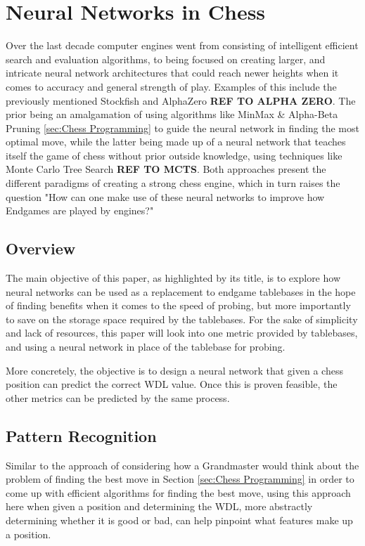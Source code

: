 \section{Neural Networks in Chess}
\label{sec:NeuralNets}

Over the last decade computer engines went from consisting of intelligent efficient search and evaluation algorithms, to being focused on creating larger, and intricate neural network architectures that could reach newer heights when it comes to accuracy and general strength of play. Examples of this include the previously mentioned Stockfish \cite{stockfish2024} and AlphaZero \textbf{REF TO ALPHA ZERO}. The prior being an amalgamation of using algorithms like MinMax \& Alpha-Beta Pruning \ref{sec:Chess Programming} to guide the neural network in finding the most optimal move, while the latter being made up of a neural network that teaches itself the game of chess without prior outside knowledge, using techniques like Monte Carlo Tree Search \textbf{REF TO MCTS}. Both approaches present the different paradigms of creating a strong chess engine, which in turn raises the question "How can one make use of these neural networks to improve how Endgames are played by engines?"

\subsection{Overview}
The main objective of this paper, as highlighted by its title, is to explore how neural networks can be used as a replacement to endgame tablebases in the hope of finding benefits when it comes to the speed of probing, but more importantly to save on the storage space required by the tablebases. For the sake of simplicity and lack of resources, this paper will look into one metric provided by tablebases, and using a neural network in place of the tablebase for probing.

More concretely, the objective is to design a neural network that given a chess position can predict the correct WDL value. Once this is proven feasible, the other metrics can be predicted by the same process. 

\subsection{Pattern Recognition}
\label{subsec:PattRec}
Similar to the approach of considering how a Grandmaster would think about the problem of finding the best move in Section \ref{sec:Chess Programming} in order to come up with efficient algorithms for finding the best move, using this approach here when given a position and determining the WDL, more abstractly determining whether it is good or bad, can help pinpoint what features make up a position.

